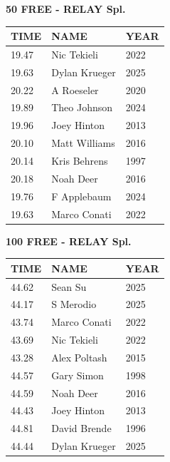 \begin{table}[H]
\centering
\begin{minipage}[t]{0.6\textwidth}
\centering
\textbf{50 FREE - RELAY Spl.}\\[0.1cm]
\begin{tabular}{@{}p{1.8cm}p{2.8cm}p{1.2cm}@{}}
\hline
    \textbf{TIME} & \textbf{NAME} & \textbf{YEAR} \\
\hline
    19.47 & Nic Tekieli & 2022 \\
    19.63 & Dylan Krueger & 2025 \\
    20.22 & A Roeseler & 2020 \\
    19.89 & Theo Johnson & 2024 \\
    19.96 & Joey Hinton & 2013 \\
    20.10 & Matt Williams & 2016 \\
    20.14 & Kris Behrens & 1997 \\
    20.18 & Noah Deer & 2016 \\
    19.76 & F Applebaum & 2024 \\
    19.63 & Marco Conati & 2022 \\
\hline
\end{tabular}
\end{minipage}
\end{table}

\begin{table}[H]
\centering
\begin{minipage}[t]{0.6\textwidth}
\centering
\textbf{100 FREE - RELAY Spl.}\\[0.1cm]
\begin{tabular}{@{}p{1.8cm}p{2.8cm}p{1.2cm}@{}}
\hline
    \textbf{TIME} & \textbf{NAME} & \textbf{YEAR} \\
\hline
    44.62 & Sean Su & 2025 \\
    44.17 & S Merodio & 2025 \\
    43.74 & Marco Conati & 2022 \\
    43.69 & Nic Tekieli & 2022 \\
    43.28 & Alex Poltash & 2015 \\
    44.57 & Gary Simon & 1998 \\
    44.59 & Noah Deer & 2016 \\
    44.43 & Joey Hinton & 2013 \\
    44.81 & David Brende & 1996 \\
    44.44 & Dylan Krueger & 2025 \\
\hline
\end{tabular}
\end{minipage}
\end{table}

